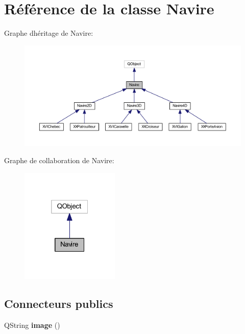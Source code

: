 \hypertarget{class_navire}{}\section{Référence de la classe Navire}
\label{class_navire}


Graphe d\textquotesingle{}héritage de Navire\+:
\nopagebreak
\begin{figure}[H]
\begin{center}
\leavevmode
\includegraphics[width=350pt]{class_navire__inherit__graph}
\end{center}
\end{figure}


Graphe de collaboration de Navire\+:
\nopagebreak
\begin{figure}[H]
\begin{center}
\leavevmode
\includegraphics[width=133pt]{class_navire__coll__graph}
\end{center}
\end{figure}
\subsection*{Connecteurs publics}
\begin{DoxyCompactItemize}
\item 
Q\+String {\bfseries image} ()\hypertarget{class_navire_a2af893fa2ff75b29f5fd1a1a916080cd}{}\label{class_navire_a2af893fa2ff75b29f5fd1a1a916080cd}

\end{DoxyCompactItemize}
